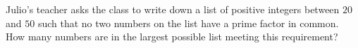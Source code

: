 Julio's teacher asks the class to write down a list of positive integers between $20$ and $50$ such that no two numbers on the list have a prime factor in common. How many numbers are in the largest possible list meeting this requirement?
